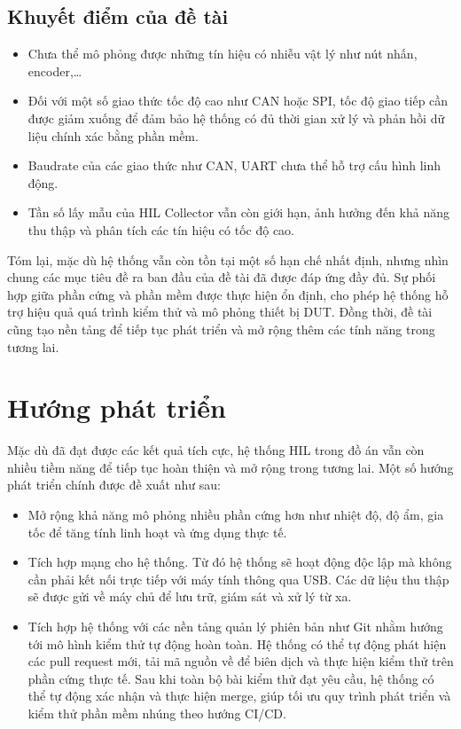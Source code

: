 \subsection{Khuyết điểm của đề tài}
\begin{itemize}
    \item Chưa thể mô phỏng được những tín hiệu có nhiễu vật lý như nút nhấn, encoder,\dots
    \item Đối với một số giao thức tốc độ cao như CAN hoặc SPI, tốc độ giao tiếp cần được giảm xuống để đảm bảo hệ thống có đủ thời gian xử lý và phản hồi dữ liệu chính xác bằng phần mềm.
    \item Baudrate của các giao thức như CAN, UART chưa thể hỗ trợ cấu hình linh động.
    \item Tần số lấy mẫu của HIL Collector vẫn còn giới hạn, ảnh hưởng đến khả năng thu thập và phân tích các tín hiệu có tốc độ cao.
\end{itemize}

Tóm lại, mặc dù hệ thống vẫn còn tồn tại một số hạn chế nhất định, nhưng nhìn chung các mục tiêu đề ra ban đầu của đề tài đã được đáp ứng đầy đủ.
Sự phối hợp giữa phần cứng và phần mềm được thực hiện ổn định, cho phép hệ thống hỗ trợ hiệu quả quá trình kiểm thử và mô phỏng thiết bị DUT.
Đồng thời, đề tài cũng tạo nền tảng để tiếp tục phát triển và mở rộng thêm các tính năng trong tương lai.

\section{Hướng phát triển}
Mặc dù đã đạt được các kết quả tích cực, hệ thống HIL trong đồ án vẫn còn nhiều tiềm năng để tiếp tục hoàn thiện và mở rộng trong tương lai. Một số hướng phát triển chính được đề xuất như sau:

\begin{itemize}
    \item Mở rộng khả năng mô phỏng nhiều phần cứng hơn như nhiệt độ, độ ẩm, gia tốc để tăng tính linh hoạt và ứng dụng thực tế.
    \item Tích hợp mạng cho hệ thống. Từ đó hệ thống sẽ hoạt động độc lập mà không cần phải kết nối trực tiếp với máy tính thông qua USB. Các dữ liệu thu thập sẽ được gửi về máy chủ để lưu trữ, giám sát và xử lý từ xa.
    \item Tích hợp hệ thống với các nền tảng quản lý phiên bản như Git nhằm hướng tới mô hình kiểm thử tự động hoàn toàn. Hệ thống có thể tự động phát hiện các pull request mới, tải mã nguồn về để biên dịch và thực hiện kiểm thử trên phần cứng thực tế.
    Sau khi toàn bộ bài kiểm thử đạt yêu cầu, hệ thống có thể tự động xác nhận và thực hiện merge, giúp tối ưu quy trình phát triển và kiểm thử phần mềm nhúng theo hướng CI/CD.
\end{itemize}

